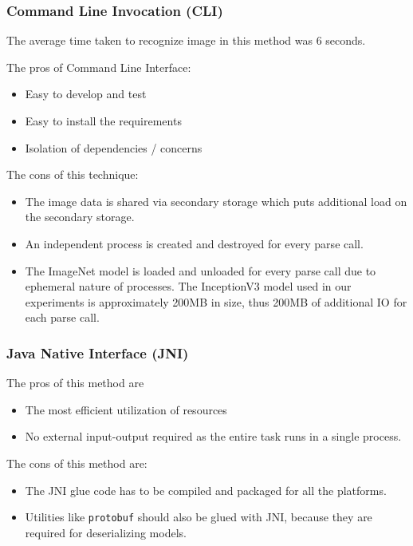 \iffalse
\subsubsection{Command Line Invocation (CLI)} \label{sec:eval-cli}
The average time taken to recognize image in this method was 6 seconds.

The pros of Command Line Interface:
\begin{itemize}
	\item Easy to develop and test
	\item Easy to install the requirements
	\item Isolation of dependencies / concerns
\end{itemize}

The cons of this technique:
\begin{itemize}
	\item The image data is shared via secondary storage which puts additional load on the secondary storage.
	\item An independent process is created and destroyed for every parse call.
	\item The ImageNet model is loaded and unloaded for every parse call due to ephemeral nature of processes. The InceptionV3 model used in our experiments is approximately 200MB in size, thus 200MB of additional IO for each parse call.
\end{itemize}

\subsubsection{Java Native Interface (JNI)} \label{sec:eval-jni}

The pros of this method are
\begin{itemize}
	\item The most efficient utilization of resources
	\item No external input-output required as the entire task runs in a single process.
\end{itemize}

The cons of this method are:
\begin{itemize}
	\item The JNI glue code has to be compiled and packaged for all the platforms.
	\item Utilities like \texttt{protobuf} should also be glued with JNI, because they are required for deserializing models\cite{javacpp-240}.
\end{itemize}

